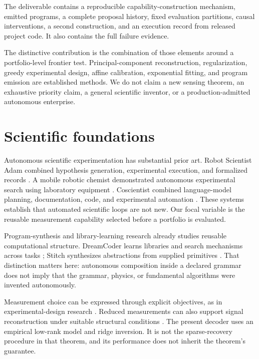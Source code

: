 \documentclass[11pt,a4paper]{article}
\begin{document}
The deliverable contains a reproducible capability-construction mechanism, emitted programs, a complete proposal history, fixed evaluation partitions, causal interventions, a second construction, and an execution record from released project code. It also contains the full failure evidence.

The distinctive contribution is the combination of those elements around a portfolio-level frontier test. Principal-component reconstruction, regularization, greedy experimental design, affine calibration, exponential fitting, and program emission are established methods. We do not claim a new sensing theorem, an exhaustive priority claim, a general scientific inventor, or a production-admitted autonomous enterprise.

\section{Scientific foundations}

Autonomous scientific experimentation has substantial prior art. Robot Scientist Adam combined hypothesis generation, experimental execution, and formalized records \citep{king2009automation}. A mobile robotic chemist demonstrated autonomous experimental search using laboratory equipment \citep{burger2020robotic}. Coscientist combined language-model planning, documentation, code, and experimental automation \citep{boiko2023coscientist}. These systems establish that automated scientific loops are not new. Our focal variable is the reusable measurement capability selected before a portfolio is evaluated.

Program-synthesis and library-learning research already studies reusable computational structure. DreamCoder learns libraries and search mechanisms across tasks \citep{ellis2021dreamcoder}; Stitch synthesizes abstractions from supplied primitives \citep{bowers2023stitch}. That distinction matters here: autonomous composition inside a declared grammar does not imply that the grammar, physics, or fundamental algorithms were invented autonomously.

Measurement choice can be expressed through explicit objectives, as in experimental-design research \citep{chaloner1995design}. Reduced measurements can also support signal reconstruction under suitable structural conditions \citep{candes2006stable}. The present decoder uses an empirical low-rank model and ridge inversion. It is not the sparse-recovery procedure in that theorem, and its performance does not inherit the theorem's guarantee.
\end{document}
